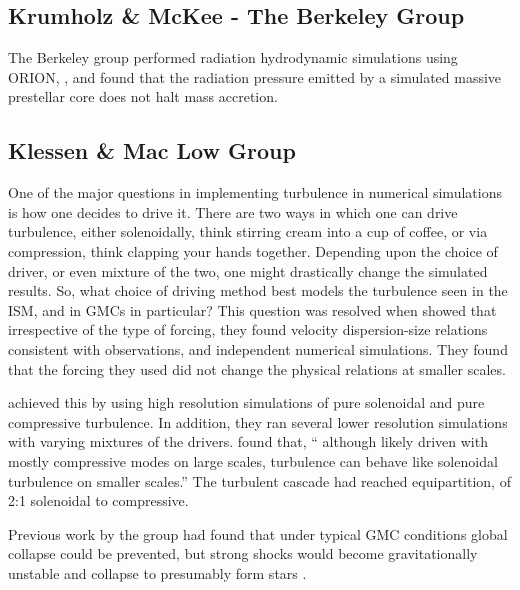 \documentclass[../dissertation.tex]{subfiles}
\begin{document}
\subsection{Krumholz \& McKee - The Berkeley Group}
The Berkeley group performed radiation hydrodynamic simulations using ORION,
\citep{2009Sci...323..754K}, and found that the radiation pressure emitted by a simulated massive prestellar core does not halt mass accretion. 


\citet{2005ApJ...630..250K}






\subsection{Klessen \& Mac Low Group} 
One of the major questions in implementing turbulence in numerical simulations is how one decides to drive it. 
There are two ways in which one can drive turbulence, either solenoidally, think stirring cream into a cup of coffee, 
or via compression, think clapping your hands together. 
Depending upon the choice of driver, or even mixture of the two, one might drastically change the simulated results. 
So, what choice of driving method best models the turbulence seen in the ISM, and in GMCs in particular?
This question was resolved when \citet{2010A&A...512A..81F} showed that irrespective of the type of forcing, 
they found velocity dispersion-size relations consistent with observations, and independent numerical simulations. 
They found that the forcing they used did not change the physical relations at smaller scales. 

\citet{2010A&A...512A..81F} achieved this by using high resolution simulations of pure solenoidal and pure compressive turbulence. 
In addition, they ran several lower resolution simulations with varying mixtures of the drivers.
\citet{2010A&A...512A..81F} found that, `` although likely driven with mostly compressive modes on large scales, turbulence can behave like solenoidal turbulence on smaller scales.''
The turbulent cascade had reached equipartition, of 2:1 solenoidal to compressive. 

Previous work by the group had found that under typical GMC conditions global collapse could be prevented, 
but strong shocks would become gravitationally unstable and collapse to presumably form stars \citep{2000ApJ...535..887K}.
\end{document}

